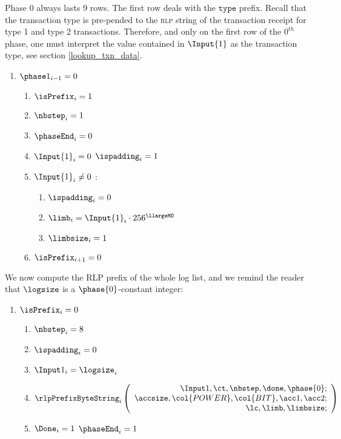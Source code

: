 \begin{center}
\end{center}

Phase 0 always lasts 9 rows.
The first row deals with the $\texttt{type}$ prefix. Recall that the transaction type is pre-pended to the \textsc{rlp} string of the transaction receipt for type 1 and type 2 transactions.
Therefore, and only on the first row of the $0^{th}$ phase, one must interpret the value contained in $\Input{1}$ as the transaction type, see section \ref{lookup_txn_data}.
\begin{enumerate}
	\item \If $\phase1_{i-1}=0$ \Then
		\begin{enumerate}
			\item $\isPrefix_{i}=1$
			\item $\nbstep_{i}=1$
			\item $\phaseEnd_{i}=0$
			\item \If $\Input{1}_{i}=0$ \Then $\ispadding_{i}=1$
			\item \If $\Input{1}_{i} \neq 0$ \Then:
				\begin{enumerate}
					\item $\ispadding_{i}=0$
					\item $\limb_{i}=\Input{1}_{i}\cdot256^{\llargeMO}$ 
					\item $\limbsize_{i}=1$
				\end{enumerate}
			\item $\isPrefix_{i+1}=0$ 
		\end{enumerate}
\end{enumerate}
We now compute the RLP prefix of the whole log list, and we remind the reader that $\logsize$ is a $\phase{0}$-constant integer:
\begin{enumerate}[resume]
	\item \If $\isPrefix_{i}=0$ \Then
		\begin{enumerate}
			\item $\nbstep_{i}=8$
			\item $\ispadding_{i}=0$
			\item $\Input1_{i} = \logsize_{i}$
			\item 
				\[
					\rlpPrefixByteString_{i}
					\left(
					\begin{array}{r}
						\Input1,
						\ct,
						\nbstep,
						\done,
						\phase{0}; \\
						\accsize,
						\col{POWER},
						\col{BIT},
						\acc1,
						\acc2; \\
						\lc,
						\limb,
						\limbsize; \\
					\end{array}
					\right)
				\]
			\item \If $\Done_{i}=1$ \Then $\phaseEnd_{i}=1$
		\end{enumerate}
\end{enumerate}
